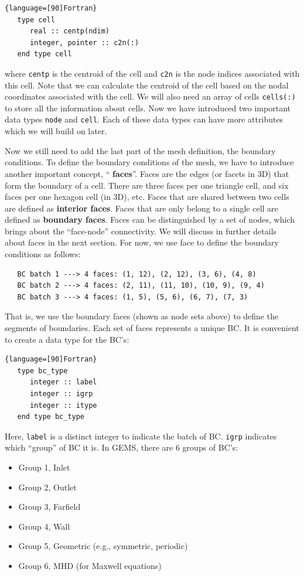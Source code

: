 \documentclass[12pt, letterpaper]{report}
\begin{document}
\begin{lstlisting}{language=[90]Fortran}
   type cell
      real :: centp(ndim)
      integer, pointer :: c2n(:)
   end type cell
\end{lstlisting}

where \verb+centp+ is the centroid of the cell and \verb+c2n+ is the node indices associated with
this cell. Note that we can calculate the centroid of the cell based on the nodal coordinates
associated with the cell. We will also need an array of cells \verb+cells(:)+ to store all the
information about cells. Now we have introduced two important data types \verb+node+ and
\verb+cell+. Each of these data types can have more attributes which we will build on later.
\paraspace

Now we still need to add the last part of the mesh definition, the boundary conditions. To define
the boundary conditions of the mesh, we have to introduce another important concept, ``{\bf
faces}''. Faces are the edges (or facets in 3D) that form the boundary of a cell. There are three
faces per one triangle cell, and six faces per one hexagon cell (in 3D), etc. Faces that are shared between
two cells are defined as {\bf interior faces}. Faces that are only belong to a single cell are
defined as {\bf boundary faces}. Faces can be distinguished by a set of nodes, which brings about
the ``face-node'' connectivity. We will discuss in further details about faces in the next section.
For now, we use face to define the boundary conditions as follows:
\begin{verbatim}
   BC batch 1 ---> 4 faces: (1, 12), (2, 12), (3, 6), (4, 8)
   BC batch 2 ---> 4 faces: (2, 11), (11, 10), (10, 9), (9, 4)
   BC batch 3 ---> 4 faces: (1, 5), (5, 6), (6, 7), (7, 3)
\end{verbatim}
That is, we use the boundary faces (shown as node sets above) to define the segments of boundaries.
Each set of faces represents a unique BC. It is convenient to create a data type for the BC's:

\begin{lstlisting}{language=[90]Fortran}
   type bc_type
      integer :: label
      integer :: igrp
      integer :: itype
   end type bc_type
\end{lstlisting}

Here, \verb+label+ is a distinct integer to indicate the batch of BC. \verb+igrp+ indicates which
``group'' of BC it is. In GEMS, there are 6 groups of BC's: 

\begin{itemize}
   \item Group 1, Inlet
   \item Group 2, Outlet
   \item Group 3, Farfield
   \item Group 4, Wall
   \item Group 5, Geometric (e.g., symmetric, periodic)
   \item Group 6, MHD (for Maxwell equations)
\end{itemize}
\end{document}
